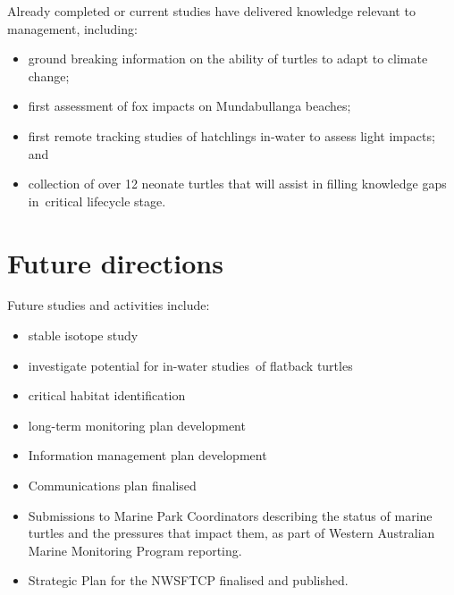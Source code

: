\documentclass[version=last,
    paper=a4, %
    10pt, %
    usenames,
    dvipsnames,
    oneside, %
    headings=openany, %
    DIV=15 %
]{scrbook}
\begin{document}
Already completed or current studies have delivered knowledge relevant
to management, including:

\begin{itemize}
\itemsep1pt\parskip0pt
\item
  ground breaking information on the ability of turtles to adapt to
  climate change;
\item
  first assessment of fox impacts on Mundabullanga beaches;
\item
  first remote tracking studies of hatchlings in-water to assess light
  impacts; and
\item
  collection of over 12 neonate turtles that will assist in filling
  knowledge gaps in~critical lifecycle stage.
\end{itemize}



\section*{Future directions}
Future studies and activities include:

\begin{itemize}
\itemsep1pt\parskip0pt
\item
  stable isotope study
\item
  investigate potential for in-water studies~of flatback turtles
\item
  critical habitat identification
\item
  long-term monitoring plan development
\item
  Information management plan development
\item
  Communications plan finalised
\item
  Submissions to Marine Park Coordinators describing the status of
  marine turtles and the pressures that impact them, as part of Western
  Australian Marine Monitoring Program reporting.
\item
  Strategic Plan for the NWSFTCP finalised and published.
\end{itemize}



\end{document}
